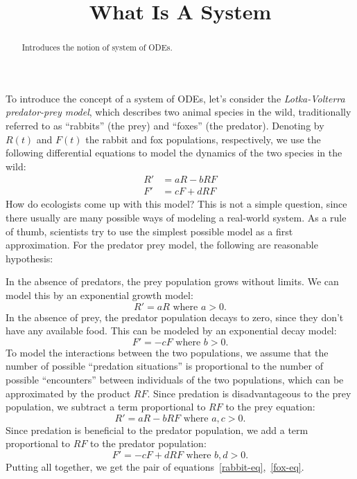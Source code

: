 \documentclass{ximera}
\title{What Is A System}
\begin{document}
\begin{abstract}
Introduces the notion of system of ODEs.
\end{abstract}

\maketitle

To introduce the concept of a system of ODEs, let's consider the \emph{Lotka-Volterra predator-prey model}, which describes two animal species in the wild, traditionally referred to as ``rabbits'' (the prey) and ``foxes'' (the predator). Denoting by $R(t)$ and $F(t)$ the rabbit and fox populations, respectively, we use the following differential equations to model the dynamics of the two species in the wild:
\begin{align}
\label{rabbit-eq}R'&=aR-bRF\\
\label{fox-eq}F'&=cF+dRF
\end{align}
How do ecologists come up with this model? This is not a simple question, since there usually are many possible ways of modeling a real-world system. As a rule of thumb, scientists try to use the simplest possible model as a first approximation. For the predator prey model, the following are reasonable hypothesis:

In the absence of predators, the prey population grows without limits. We can model this by an exponential growth model:
\[
R'=aR\text{ where $a>0$}.
\]
In the absence of prey, the predator population decays to zero, since they don't have any available food. This can be modeled by an exponential decay model:
\[
F'=-cF\text{ where $b>0$.}
\]
To model the interactions between the two populations, we assume that the number of possible ``predation situations'' is proportional to the number of possible ``encounters'' between individuals of the two populations, which can be approximated by the product $RF$.
Since predation is disadvantageous to the prey population, we subtract a term proportional to $RF$ to the prey equation:
\[
R'=aR-bRF\text{ where $a,c>0$}.
\]
Since predation is beneficial to the predator population, we add a term proportional to $RF$ to the predator population:
\[
F'=-cF+dRF\text{ where $b,d>0$.}
\]
Putting all together, we get the pair of equations~\ref{rabbit-eq},~\ref{fox-eq}.
\end{document}

